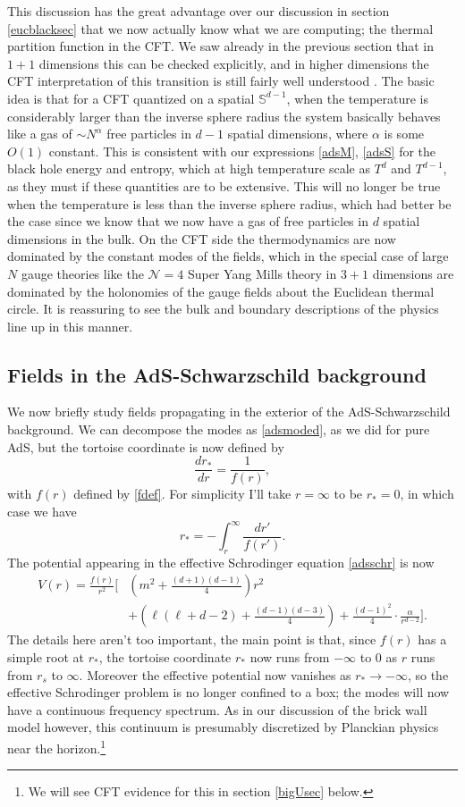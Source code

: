 \documentclass[12pt]{article}
\newcommand{\be}{\begin{equation}}
\newcommand{\ee}{\end{equation}}
\begin{document}
This discussion has the great advantage over our discussion in section \eqref{eucblacksec} that we now actually know what we are computing; the thermal partition function in the CFT.  We saw already in the previous section that in $1+1$ dimensions this can be checked explicitly, and in higher dimensions the CFT interpretation of this transition is still fairly well understood \cite{Witten:1998zw,Aharony:2003sx}.  The basic idea is that for a CFT quantized on a spatial $\mathbb{S}^{d-1}$, when the temperature is considerably larger than the inverse sphere radius the system basically behaves like a gas of $\sim N^\alpha$ free particles in $d-1$ spatial dimensions, where $\alpha$ is some $O(1)$ constant.  This is consistent with our expressions \eqref{adsM}, \eqref{adsS} for the black hole energy and entropy, which at high temperature scale as $T^{d}$ and $T^{d-1}$, as they must if these quantities are to be extensive.  This will no longer be true when the temperature is less than the inverse sphere radius, which had better be the case since we know that we now have a gas of free particles in $d$ spatial dimensions in the bulk. On the CFT side the thermodynamics are now dominated by the constant modes of the fields, which in the special case of large $N$ gauge theories like the $\mathcal{N}=4$ Super Yang Mills theory in $3+1$ dimensions are dominated by the holonomies of the gauge fields about the Euclidean thermal circle.  It is reassuring to see the bulk and boundary descriptions of the physics line up in this manner.

\subsection{Fields in the AdS-Schwarzschild background}\label{fieldsonadss}
We now briefly study fields propagating in the exterior of the AdS-Schwarzschild background.  We can decompose the modes as \eqref{adsmoded}, as we did for pure AdS, but the tortoise coordinate is now defined by
\be
\frac{dr_*}{dr}=\frac{1}{f(r)},
\ee
with $f(r)$ defined by \eqref{fdef}.  For simplicity I'll take $r=\infty$ to be $r_*=0$, in which case we have
\be\label{adstort}
r_*=-\int_r^\infty\frac{dr'}{f(r')}.
\ee
The potential appearing in the effective Schrodinger equation \eqref{adsschr} is now 
\begin{align}\nonumber
V(r)=\frac{f(r)}{r^2}\Bigg[&\left(m^2+\frac{(d+1)(d-1)}{4}\right)r^2\\
&+\left(\ell(\ell+d-2)+\frac{(d-1)(d-3)}{4}\right)+\frac{(d-1)^2}{4}\cdot\frac{\alpha}{r^{d-2}}\Bigg].
\end{align}
The details here aren't too important, the main point is that, since $f(r)$ has a simple root at $r_*$, the tortoise coordinate $r_*$ now runs from $-\infty$ to $0$ as $r$ runs from $r_s$ to $\infty$.  Moreover the effective potential now vanishes as $r_*\to -\infty$, so the effective Schrodinger problem is no longer confined to a box; the modes will now have a continuous frequency spectrum.  As in our discussion of the brick wall model however, this continuum is presumably discretized by Planckian physics near the horizon.\footnote{We will see CFT evidence for this in section \ref{bigUsec} below.}    
\end{document}
